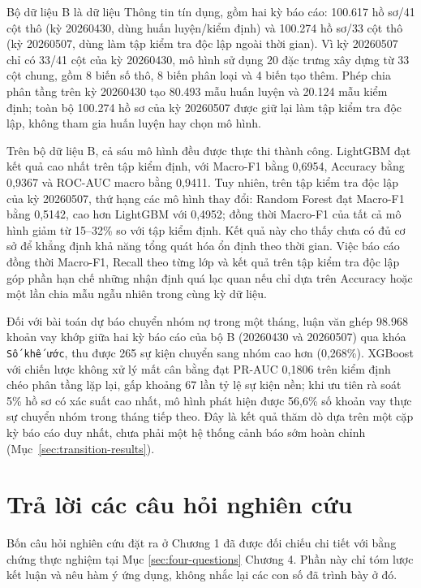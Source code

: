 Bộ dữ liệu B là dữ liệu Thông tin tín dụng, gồm hai kỳ báo cáo: 100.617 hồ sơ/41 cột thô (kỳ 20260430, dùng huấn luyện/kiểm định) và 100.274 hồ sơ/33 cột thô (kỳ 20260507, dùng làm tập kiểm tra độc lập ngoài thời gian). Vì kỳ 20260507 chỉ có 33/41 cột của kỳ 20260430, mô hình sử dụng 20 đặc trưng xây dựng từ 33 cột chung, gồm 8 biến số thô, 8 biến phân loại và 4 biến tạo thêm. Phép chia phân tầng trên kỳ 20260430 tạo 80.493 mẫu huấn luyện và 20.124 mẫu kiểm định; toàn bộ 100.274 hồ sơ của kỳ 20260507 được giữ lại làm tập kiểm tra độc lập, không tham gia huấn luyện hay chọn mô hình.

Trên bộ dữ liệu B, cả sáu mô hình đều được thực thi thành công. LightGBM đạt kết quả cao nhất trên tập kiểm định, với Macro-F1 bằng 0,6954, Accuracy bằng 0,9367 và ROC-AUC macro bằng 0,9411. Tuy nhiên, trên tập kiểm tra độc lập của kỳ 20260507, thứ hạng các mô hình thay đổi: Random Forest đạt Macro-F1 bằng 0,5142, cao hơn LightGBM với 0,4952; đồng thời Macro-F1 của tất cả mô hình giảm từ 15--32\% so với tập kiểm định. Kết quả này cho thấy chưa có đủ cơ sở để khẳng định khả năng tổng quát hóa ổn định theo thời gian. Việc báo cáo đồng thời Macro-F1, Recall theo từng lớp và kết quả trên tập kiểm tra độc lập góp phần hạn chế những nhận định quá lạc quan nếu chỉ dựa trên Accuracy hoặc một lần chia mẫu ngẫu nhiên trong cùng kỳ dữ liệu.

Đối với bài toán dự báo chuyển nhóm nợ trong một tháng, luận văn ghép 98.968 khoản vay khớp giữa hai kỳ báo cáo của bộ B (20260430 và 20260507) qua khóa \texttt{Số khế ước}, thu được 265 sự kiện chuyển sang nhóm cao hơn (0,268\%). XGBoost với chiến lược không xử lý mất cân bằng đạt PR-AUC 0,1806 trên kiểm định chéo phân tầng lặp lại, gấp khoảng 67 lần tỷ lệ sự kiện nền; khi ưu tiên rà soát 5\% hồ sơ có xác suất cao nhất, mô hình phát hiện được 56,6\% số khoản vay thực sự chuyển nhóm trong tháng tiếp theo. Đây là kết quả thăm dò dựa trên một cặp kỳ báo cáo duy nhất, chưa phải một hệ thống cảnh báo sớm hoàn chỉnh (Mục~\ref{sec:transition-results}).

\section{Trả lời các câu hỏi nghiên cứu}

Bốn câu hỏi nghiên cứu đặt ra ở Chương 1 đã được đối chiếu chi tiết với bằng chứng thực nghiệm tại Mục \ref{sec:four-questions} Chương 4. Phần này chỉ tóm lược kết luận và nêu hàm ý ứng dụng, không nhắc lại các con số đã trình bày ở đó.

